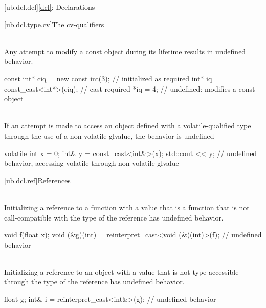 [ub.dcl.dcl]{\ref{dcl}: Declarations}

[ub.dcl.type.cv]{The cv-qualifiers}

\pnum
{} \\
Any attempt to modify a const object during its lifetime results in
undefined behavior.

\pnum
\begin{example}
\begin{codeblock}
const int* ciq = new const int(3);  // initialized as required
int* iq = const_cast<int*>(ciq);    // cast required
*iq = 4;                            // undefined: modifies a const object
\end{codeblock}
\end{example}


\pnum
{} \\
If an attempt is made to
access an object defined with a volatile-qualified type through the use of a non-volatile glvalue, the behavior
is undefined

\pnum
\begin{example}
\begin{codeblock}
volatile int x = 0;
int& y = const_cast<int&>(x);
std::cout << y;         // undefined behavior, accessing volatile through non-volatile glvalue
\end{codeblock}
\end{example}

[ub.dcl.ref]{References}

\pnum
{} \\
Initializing a reference to a function
with a value that is a function
that is not call-compatible
with the type of the reference
has undefined behavior.

\pnum
\begin{example}
\begin{codeblock}
void f(float x);
void (&g)(int) = reinterpret_cast<void (&)(int)>(f);    // undefined behavior
\end{codeblock}
\end{example}

\pnum
{} \\
Initializing a reference to an object
with a value that is not
type-accessible through
the type of the reference
has undefined behavior.

\pnum
\begin{example}
\begin{codeblock}
float g;
int& i = reinterpret_cast<int&>(g);     // undefined behavior
\end{codeblock}
\end{example}

